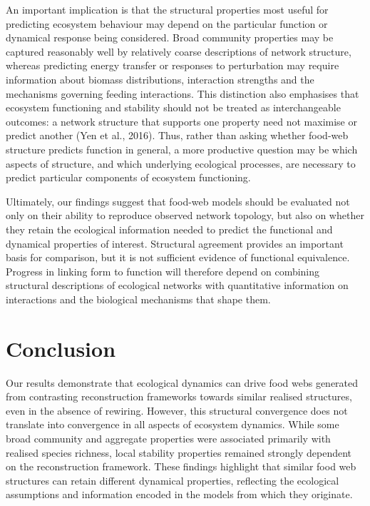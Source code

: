 \documentclass[
]{article}
\begin{document}
An important implication is that the structural properties most useful
for predicting ecosystem behaviour may depend on the particular function
or dynamical response being considered. Broad community properties may
be captured reasonably well by relatively coarse descriptions of network
structure, whereas predicting energy transfer or responses to
perturbation may require information about biomass distributions,
interaction strengths and the mechanisms governing feeding interactions.
This distinction also emphasises that ecosystem functioning and
stability should not be treated as interchangeable outcomes: a network
structure that supports one property need not maximise or predict
another (Yen et al., 2016). Thus, rather than asking whether food-web
structure predicts function in general, a more productive question may
be which aspects of structure, and which underlying ecological
processes, are necessary to predict particular components of ecosystem
functioning.

Ultimately, our findings suggest that food-web models should be
evaluated not only on their ability to reproduce observed network
topology, but also on whether they retain the ecological information
needed to predict the functional and dynamical properties of interest.
Structural agreement provides an important basis for comparison, but it
is not sufficient evidence of functional equivalence. Progress in
linking form to function will therefore depend on combining structural
descriptions of ecological networks with quantitative information on
interactions and the biological mechanisms that shape them.

\section{Conclusion}\label{conclusion}

Our results demonstrate that ecological dynamics can drive food webs
generated from contrasting reconstruction frameworks towards similar
realised structures, even in the absence of rewiring. However, this
structural convergence does not translate into convergence in all
aspects of ecosystem dynamics. While some broad community and aggregate
properties were associated primarily with realised species richness,
local stability properties remained strongly dependent on the
reconstruction framework. These findings highlight that similar food web
structures can retain different dynamical properties, reflecting the
ecological assumptions and information encoded in the models from which
they originate.
\end{document}
